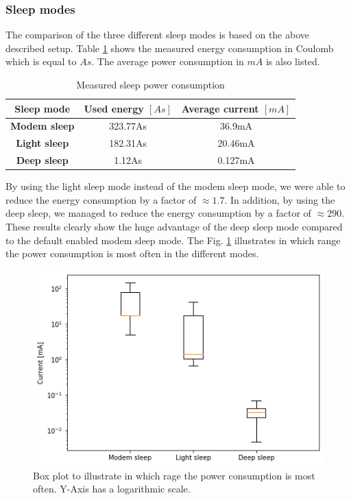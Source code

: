 \subsubsection{Sleep modes}
The comparison of the three different sleep modes is based on the above described setup.
Table \ref{tab:sleep_modes_15min} shows the measured energy consumption in Coulomb which is equal to $As$.
The average power consumption in $mA$ is also listed.

\begin{table}[htbp]
\caption{Measured sleep power consumption}
\begin{center}
\begin{tabular}{|c|c|c|}
\hline
\textbf{Sleep mode}&\textbf{Used energy $[As]$}&\textbf{Average current $[mA]$}\\
\hline
\textbf{Modem sleep} & 323.77As & 36.9mA\\
\textbf{Light sleep} & 182.31As & 20.46mA\\
\textbf{Deep sleep}  & 1.12As   & 0.127mA\\
\hline
\end{tabular}
\label{tab:sleep_modes_15min}
\end{center}
\end{table}

By using the light sleep mode instead of the modem sleep mode, we were able to reduce the energy consumption by a factor of $\approx 1.7$.
In addition, by using the deep sleep, we managed to reduce the energy consumption by a factor of $\approx 290$.
These results clearly show the huge advantage of the deep sleep mode compared to the default enabled modem sleep mode.
The Fig. \ref{fig:sleep_compare_boxplot} illustrates in which range the power consumption is most often in the different modes.

\begin{figure}[H]
    \includegraphics[width = \linewidth]{fig/sleep_compare_boxplot.png}
    \caption{Box plot to illustrate in which rage the power consumption is most often. Y-Axis has a logarithmic scale.}
    \label{fig:sleep_compare_boxplot}
\end{figure}